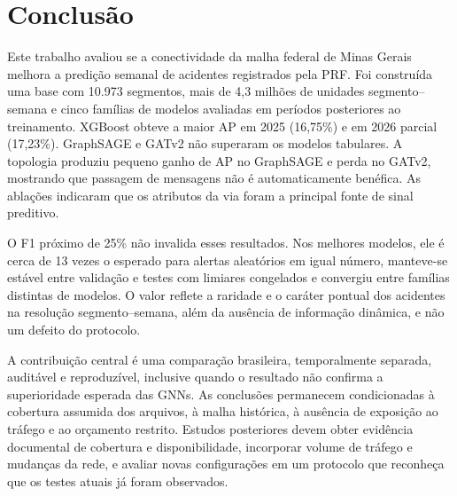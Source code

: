 \documentclass[12pt]{article}
\begin{document}
\section{Conclusão}
\label{sec:conclusao}

Este trabalho avaliou se a conectividade da malha federal de Minas
Gerais melhora a predição semanal de acidentes registrados pela PRF.
Foi construída uma base com 10.973 segmentos, mais de 4,3 milhões de
unidades segmento--semana e cinco famílias de modelos avaliadas em
períodos posteriores ao treinamento. XGBoost obteve a maior AP em 2025
(16,75\%) e em 2026 parcial (17,23\%). GraphSAGE e GATv2 não superaram
os modelos tabulares. A topologia produziu pequeno ganho de AP no
GraphSAGE e perda no GATv2, mostrando que passagem de mensagens não é
automaticamente benéfica. As ablações indicaram que os atributos da via
foram a principal fonte de sinal preditivo.

O F1 próximo de 25\% não invalida esses resultados. Nos melhores
modelos, ele é cerca de 13 vezes o esperado para alertas aleatórios em igual número, manteve-se
estável entre validação e testes com limiares congelados e convergiu
entre famílias distintas de modelos. O valor reflete a raridade e o
caráter pontual dos acidentes na resolução segmento--semana, além da
ausência de informação dinâmica, e não um defeito do protocolo.

A contribuição central é uma comparação brasileira, temporalmente
separada, auditável e reproduzível, inclusive quando o resultado não
confirma a superioridade esperada das GNNs. As conclusões permanecem
condicionadas à cobertura assumida dos arquivos, à malha histórica, à
ausência de exposição ao tráfego e ao orçamento restrito. Estudos
posteriores devem obter evidência documental de cobertura e
disponibilidade, incorporar volume de tráfego e mudanças da rede, e
avaliar novas configurações em um protocolo que reconheça que os testes
atuais já foram observados.


\end{document}
